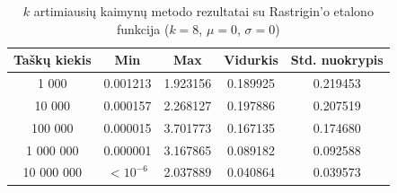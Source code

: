 \begin{table}[H]
    \centering
    \begin{tabular}{|c|c|c|c|c|}
        \hline
        \textbf{Taškų kiekis} & \textbf{Min} & \textbf{Max} & \textbf{Vidurkis} & \textbf{Std. nuokrypis} \\ \hline
        1 000        & 0.001213 & 1.923156 & 0.189925 & 0.219453 \\ \hline
        10 000       & 0.000157 & 2.268127 & 0.197886 & 0.207519 \\ \hline
        100 000      & 0.000015 & 3.701773 & 0.167135 & 0.174680 \\ \hline
        1 000 000    & 0.000001 & 3.167865 & 0.089182 & 0.092588 \\ \hline
        10 000 000   & $<10^{-6}$ & 2.037889 & 0.040864 & 0.039573 \\ \hline
    \end{tabular}
    \caption{$k$ artimiausių kaimynų metodo rezultatai su Rastrigin'o etalono funkcija ($k = 8$, $\mu = 0$, $\sigma = 0$)}
\end{table}